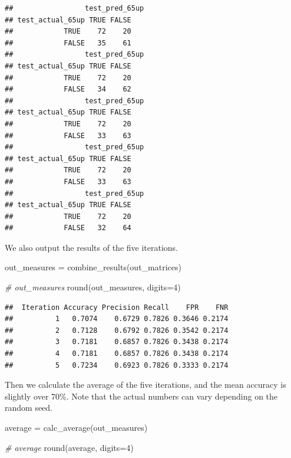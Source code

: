 \documentclass[
]{article}
\newenvironment{Shaded}{\begin{snugshade}}{\end{snugshade}}
\newcommand{\AttributeTok}[1]{\textcolor[rgb]{0.77,0.63,0.00}{#1}}
\newcommand{\CommentTok}[1]{\textcolor[rgb]{0.56,0.35,0.01}{\textit{#1}}}
\newcommand{\DecValTok}[1]{\textcolor[rgb]{0.00,0.00,0.81}{#1}}
\newcommand{\FunctionTok}[1]{\textcolor[rgb]{0.00,0.00,0.00}{#1}}
\newcommand{\NormalTok}[1]{#1}
\newcommand{\OtherTok}[1]{\textcolor[rgb]{0.56,0.35,0.01}{#1}}
\begin{document}
\begin{verbatim}
##                 test_pred_65up
## test_actual_65up TRUE FALSE
##            TRUE    72    20
##            FALSE   35    61
##                 test_pred_65up
## test_actual_65up TRUE FALSE
##            TRUE    72    20
##            FALSE   34    62
##                 test_pred_65up
## test_actual_65up TRUE FALSE
##            TRUE    72    20
##            FALSE   33    63
##                 test_pred_65up
## test_actual_65up TRUE FALSE
##            TRUE    72    20
##            FALSE   33    63
##                 test_pred_65up
## test_actual_65up TRUE FALSE
##            TRUE    72    20
##            FALSE   32    64
\end{verbatim}

We also output the results of the five iterations.

\begin{Shaded}
\begin{Highlighting}[]
\NormalTok{out\_measures }\OtherTok{=} \FunctionTok{combine\_results}\NormalTok{(out\_matrices)}

\CommentTok{\# out\_measures}
\FunctionTok{round}\NormalTok{(out\_measures, }\AttributeTok{digits=}\DecValTok{4}\NormalTok{)}
\end{Highlighting}
\end{Shaded}

\begin{verbatim}
##  Iteration Accuracy Precision Recall    FPR    FNR
##          1   0.7074    0.6729 0.7826 0.3646 0.2174
##          2   0.7128    0.6792 0.7826 0.3542 0.2174
##          3   0.7181    0.6857 0.7826 0.3438 0.2174
##          4   0.7181    0.6857 0.7826 0.3438 0.2174
##          5   0.7234    0.6923 0.7826 0.3333 0.2174
\end{verbatim}

Then we calculate the average of the five iterations, and the mean
accuracy is slightly over 70\%. Note that the actual numbers can vary
depending on the random seed.

\begin{Shaded}
\begin{Highlighting}[]
\NormalTok{average }\OtherTok{=} \FunctionTok{calc\_average}\NormalTok{(out\_measures)}

\CommentTok{\# average}
\FunctionTok{round}\NormalTok{(average, }\AttributeTok{digits=}\DecValTok{4}\NormalTok{)}
\end{Highlighting}
\end{Shaded}
\end{document}
